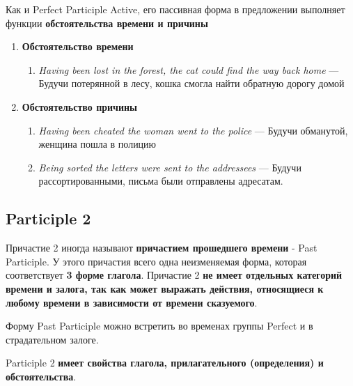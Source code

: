 \documentclass{article}
\begin{document}
Как и Perfect Participle Active, его пассивная форма в предложении выполняет функции \textbf{обстоятельства времени и причины}

\begin{enumerate}
	\item \textbf{Обстоятельство времени}
	\begin{enumerate}
		\item \emph{Having been lost in the forest, the cat could find the way back home} — Будучи потерянной в лесу, кошка смогла найти обратную дорогу домой
	\end{enumerate}
	\item \textbf{Обстоятельство причины}
	\begin{enumerate}
		\item \emph{Having been cheated the woman went to the police} — Будучи обманутой, женщина пошла в полицию
		\item \emph{Being sorted the letters were sent to the addressees} — Будучи рассортированными, письма были отправлены адресатам.
	\end{enumerate}
\end{enumerate}

\subsection{Participle 2}

Причастие 2 иногда называют \textbf{причастием прошедшего времени} - Past Participle. У этого причастия всего одна неизменяемая форма, которая соответствует \textbf{3 форме глагола}. Причастие 2 \textbf{не имеет отдельных категорий времени и залога, так как может выражать действия, относящиеся к любому времени в зависимости от времени сказуемого}.

Форму Past Participle можно встретить во временах группы Perfect и в страдательном залоге.

Participle 2 \textbf{имеет свойства глагола, прилагательного (определения) и обстоятельства}.
\end{document}
